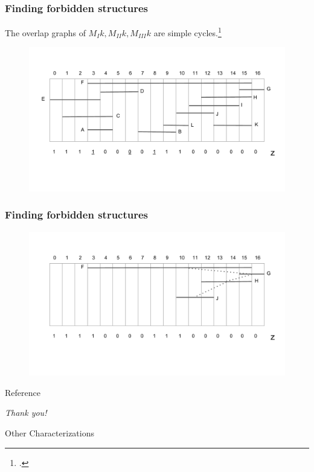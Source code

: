 \documentclass{beamer}
\begin{document}
\begin{frame}
	\frametitle{Finding forbidden structures}
    
    The overlap graphs of $M_I{k},M_{II}{k},M_{III}{k}$ are simple cycles.\footcite{lindzey2016linear}
    
	\begin{figure}
		\includegraphics[width = 1\textwidth]{figures/lm_2.pdf}
	\end{figure}
	
\end{frame}
\begin{frame}
	\frametitle{Finding forbidden structures}
	\begin{figure}
		\includegraphics[width = 1\textwidth]{figures/lm_5.pdf}
	\end{figure}
	
\end{frame}

\begin{frame}[allowframebreaks]{Reference}
    \printbibliography
\end{frame}

\begin{frame}{}
  \centering \Large
  \emph{Thank you!}
\end{frame}

\begin{frame}{}
  
\end{frame}
\begin{frame}{}
  
\end{frame}
\begin{frame}{}
  
\end{frame}


\begin{frame}[allowframebreaks]{Other Characterizations}
    
    \cite{gilmore1964characterization}
    \cite{habib2000lex}
    \cite{corneil2009lbfs}
    \cite{mcconnell2009linear}
\end{frame}
\end{document}
